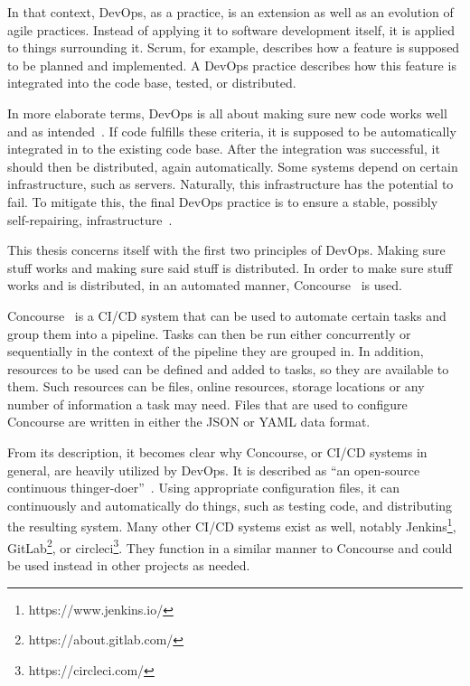 In that context, DevOps, as a practice, is an extension as well as an evolution of agile practices.
Instead of applying it to software development itself, it is applied to things surrounding it.
Scrum, for example, describes how a feature is supposed to be planned and implemented.
A DevOps practice describes how this feature is integrated into the code base, tested, or distributed.

In more elaborate terms, DevOps is all about making sure new code works well and as intended~\cite{the-software-architext-and-devops}.
If code fulfills these criteria, it is supposed to be automatically integrated in to the existing code base.
After the integration was successful, it should then be distributed, again automatically.
Some systems depend on certain infrastructure, such as servers.
Naturally, this infrastructure has the potential to fail.
To mitigate this, the final DevOps practice is to ensure a stable, possibly self-repairing, infrastructure~\cite{container-and-microservice-driven-design-for-cloud-infrastructure-devops}.

This thesis concerns itself with the first two principles of DevOps.
Making sure stuff works and making sure said stuff is distributed.
In order to make sure stuff works and is distributed, in an automated manner, Concourse~\cite{concourse} is used.

Concourse~\cite{concourse} is a CI/CD system that can be used to automate certain tasks and group them into a pipeline.
Tasks can then be run either concurrently or sequentially in the context of the pipeline they are grouped in.
In addition, resources to be used can be defined and added to tasks, so they are available to them.
Such resources can be files, online resources, storage locations or any number of information a task may need.
Files that are used to configure Concourse are written in either the JSON or YAML data format.

\pagebreak

From its description, it becomes clear why Concourse, or CI/CD systems in general, are heavily utilized by DevOps.
It is described as ``an open-source continuous thinger-doer''~\cite{concourse}.
Using appropriate configuration files, it can continuously and automatically do things, such as testing code, and distributing the resulting system.
Many other CI/CD systems exist as well, notably Jenkins\footnote{https://www.jenkins.io/}, GitLab\footnote{https://about.gitlab.com/}, or circleci\footnote{https://circleci.com/}.
They function in a similar manner to Concourse and could be used instead in other projects as needed.

